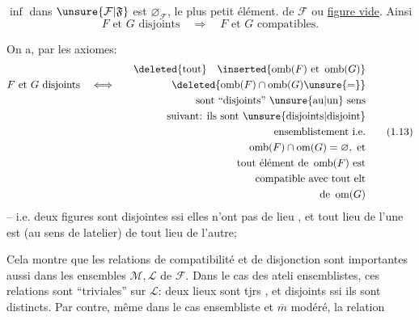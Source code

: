$\inf$ dans $\unsure{\mathcal{F}|\mathfrak{F}}$ est $\varnothing_{\mathcal{F}}$, le plus petit élément. de $\mathcal{F}$ ou \uline{figure vide}. Ainsi
\[
F\text{ et }G\text{ disjoints}\quad\Longrightarrow\quad F\text{ et }G\text{ compatibles}.
\]

On a, par les axiomes:
\[
\begin{aligned}
&&\deleted{\text{tout}}\quad\inserted{\operatorname{omb}(F)\text{ et }\operatorname{omb}(G)}\\
F\text{ et }G\text{ disjoints}&\quad\Longleftrightarrow\quad&\deleted{\operatorname{omb}(F)\cap\operatorname{omb}(G)\unsure{=}}\\
&&\text{sont ``disjoints'' \unsure{au|un} sens}\\
&&\text{suivant: ils sont \unsure{disjoints|disjoint}}\\
&&\text{ensemblistement i.e.}\\
&&\operatorname{omb}(F)\cap\operatorname{om}(G)=\varnothing,\ \text{et}\\
&&\text{tout élément de }\operatorname{omb}(F)\text{ est}\\
&&\text{compatible avec tout elt}\\
&&\text{de }\operatorname{om}(G)
\end{aligned}\tag*{(1.13)}
\]
-- i.e. deux figures sont disjointes ssi elles n'ont pas de lieu , et tout lieu de l'une est   (au sens de latelier) de tout lieu de l'autre;

Cela montre que les relations de compatibilité et de disjonction sont importantes aussi dans les  ensembles $\mathcal{M},\mathcal{L}$ de $\mathcal{F}$. Dans le cas des ateli ensemblistes, ces relations sont ``triviales'' sur $\mathcal{L}$: deux lieux sont tjrs  , et disjoints ssi ils sont distincts. Par contre, même dans le cas ensembliste et $\overline m$ modéré, la relation
